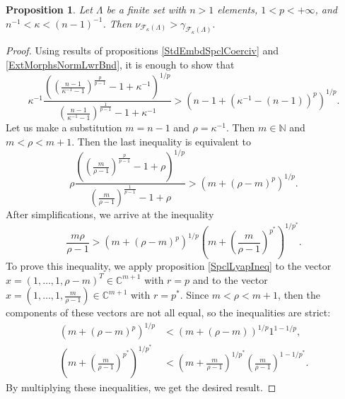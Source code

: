 \documentclass[12pt]{article}
\newtheorem{proposition}[theorem]{Proposition}
\begin{document}
\begin{proposition}\label{CompStdEmbdCoercvAndExtMorphsNormInf}
    Let $\Lambda$ be a finite set with $n>1$ elements, $1<p<+\infty$, 
    and $n^{-1}<\kappa<(n-1)^{-1}$. Then
    $
    \nu_{\mathcal{F}_{\kappa}(\Lambda)}
    >
    \gamma_{\mathcal{F}_{\kappa}(\Lambda)}.
    $
\end{proposition}
\begin{proof}
    Using results of propositions \ref{StdEmbdSpclCoerciv} 
    and \ref{ExtMorphsNormLwrBnd}, it is enough to show that
    \[
        \kappa^{-1}
        \frac{
            \left(
                \left(\frac{n-1}{\kappa^{-1}-1}
                \right)^{\frac{p}{p-1}}
                -1+\kappa^{-1}
            \right)^{1/p}
        }{
            \left(\frac{n-1}{\kappa^{-1}-1}
            \right)^{\frac{1}{p-1}}
            -1+\kappa^{-1}
        }
        >
        (n-1+(\kappa^{-1}-(n-1))^p)^{1/p}.
    \]
    Let us make a substitution $m=n-1$ and $\rho=\kappa^{-1}$. 
    Then $m\in\mathbb{N}$ and $m<\rho<m+1$. Then the last inequality is 
    equivalent to
    \[
        \rho
        \frac{
            \left(
                \left(\frac{m}{\rho-1}
                \right)^{\frac{p}{p-1}}
                -1+\rho
            \right)^{1/p}
        }{
            \left(\frac{m}{\rho-1}
            \right)^{\frac{1}{p-1}}
            -1+\rho
        }
        >
        (m+(\rho-m)^p)^{1/p}.
    \] 
    After simplifications, we arrive at the inequality
    \[
        \frac{m\rho}{\rho-1}
        >
        (m+(\rho-m)^p)^{1/p}
        \left(
            m+\left(\frac{m}{\rho-1}\right)^{p^*}
        \right)^{1/p^*}.
    \]
    To prove this inequality, we apply proposition \ref{SpclLyapIneq} to the 
    vector $x=(1,\ldots,1,\rho-m)^T\in\mathbb{C}^{m+1}$ with $r=p$ and to the 
    vector $x=(1,\ldots,1,\frac{m}{\rho-1})\in\mathbb{C}^{m+1}$ with $r=p^*$. 
    Since $m<\rho<m+1$, then the components of these vectors are not all equal,
    so the inequalities are strict:
    \[
    \begin{aligned}
        (m+(\rho-m)^p)^{1/p}
        &<
        (m+(\rho-m))^{1/p} 1^{1-1/p},\\
        \left(m+\left(\frac{m}{\rho-1}\right)^{p^*}\right)^{1/p^*}
        &<
        \left(m+\frac{m}{\rho-1}\right)^{1/p^*}
        \left(\frac{m}{\rho-1}\right)^{1-1/p^*}.
    \end{aligned}
    \]
    By multiplying these inequalities, we get the desired result.
\end{proof}
\end{document}
